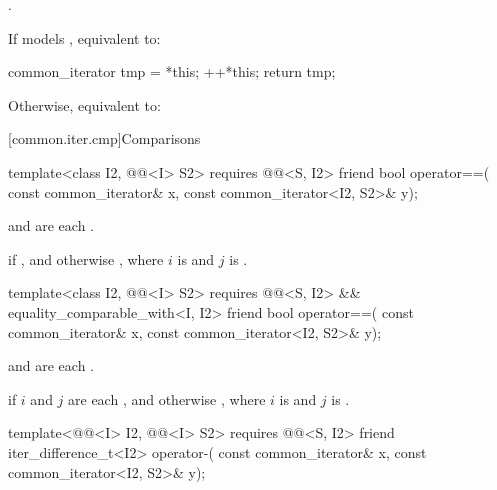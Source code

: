 \begin{itemdescr}
\pnum
\expects
{}.

\pnum
\effects
If  models , equivalent to:
\begin{codeblock}
common_iterator tmp = *this;
++*this;
return tmp;
\end{codeblock}
Otherwise, equivalent to: 
\end{itemdescr}

[common.iter.cmp]{Comparisons}

%
\begin{itemdecl}
template<class I2, @@<I> S2>
  requires @@<S, I2>
friend bool operator==(
  const common_iterator& x, const common_iterator<I2, S2>& y);
\end{itemdecl}

\begin{itemdescr}
\pnum
\expects
{} and 
are each .

\pnum
\returns
{} if ,
and otherwise ,
where $i$ is  and $j$ is .
\end{itemdescr}

%
\begin{itemdecl}
template<class I2, @@<I> S2>
  requires @@<S, I2> && equality_comparable_with<I, I2>
friend bool operator==(
  const common_iterator& x, const common_iterator<I2, S2>& y);
\end{itemdecl}

\begin{itemdescr}
\pnum
\expects
{} and 
are each .

\pnum
\returns
{} if $i$ and $j$ are each , and otherwise
, where
$i$ is  and $j$ is .
\end{itemdescr}

%
\begin{itemdecl}
template<@@<I> I2, @@<I> S2>
  requires @@<S, I2>
friend iter_difference_t<I2> operator-(
  const common_iterator& x, const common_iterator<I2, S2>& y);
\end{itemdecl}

